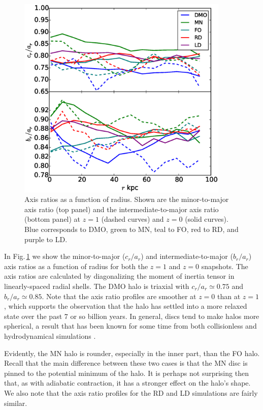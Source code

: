 \begin{figure} 
\centering 
\includegraphics[width=0.9\textwidth]{../figures/eigenratios_vs_radius.eps} 
\caption{Axis ratios as a function of radius.  Shown are the
  minor-to-major axis ratio (top panel) and the intermediate-to-major
  axis ratio (bottom panel) at $z=1$ (dashed curves) and $z=0$ (solid
  curves).  Blue corresponds to DMO, green to MN, teal to FO, red to RD, and
  purple to LD.}
\label{fig:axis_ratios}
\end{figure}

In Fig.\,\ref{fig:axis_ratios} we show the minor-to-major ($c_r/a_r$)
and intermediate-to-major ($b_r/a_r$) axis ratios as a function of
radius for both the $z=1$ and $z=0$ snapshots.  The axis ratios are
calculated by diagonalizing the moment of inertia tensor in
linearly-spaced radial shells.  The DMO halo is triaxial with
$c_r/a_r\simeq 0.75$ and $b_r/a_r\simeq 0.85$.  Note that the axis
ratio profiles are smoother at $z=0$ than at $z=1$, which supports the
observation that the halo has settled into a more relaxed state over
the past $7$ or so billion years.  In general, discs tend to make
halos more spherical, a result that has been known for some time from
both collisionless and hydrodynamical simulations
\citep[e.g.][]{dubinski1994_ApJ431_617,Zemp2012}.


Evidently, the MN halo is rounder, especially in the inner part, than
the FO halo.  Recall that the main difference between these two cases
is that the MN disc is pinned to the potential minimum of the halo.
It is perhaps not surprising then that, as with adiabatic contraction,
it has a stronger effect on the halo's shape.  
We also note that the axis ratio profiles for the RD and LD simulations
are fairly similar.  


